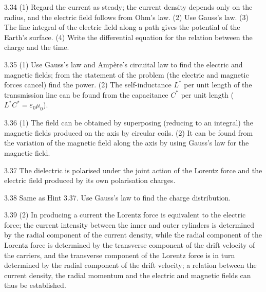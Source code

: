 \begin{hint}{3.34}
(1) Regard the current as steady; the current density depends only on the radius, and the electric field follows from Ohm's law. (2) Use Gauss's law. (3) The line integral of the electric field along a path gives the potential of the Earth's surface. (4) Write the differential equation for the relation between the charge and the time.
\end{hint}

\begin{hint}{3.35}
(1) Use Gauss's law and Ampère's circuital law to find the electric and magnetic fields; from the statement of the problem (the electric and magnetic forces cancel) find the power. (2) The self-inductance $L^*$ per unit length of the transmission line can be found from the capacitance $C^*$ per unit length ($L^*C^*=\varepsilon_0\mu_0$).
\end{hint}

\begin{hint}{3.36}
(1) The field can be obtained by superposing (reducing to an integral) the magnetic fields produced on the axis by circular coils. (2) It can be found from the variation of the magnetic field along the axis by using Gauss's law for the magnetic field.
\end{hint}

\begin{hint}{3.37}
The dielectric is polarised under the joint action of the Lorentz force and the electric field produced by its own polarisation charges.
\end{hint}

\begin{hint}{3.38}
Same as Hint 3.37. Use Gauss's law to find the charge distribution.
\end{hint}

\begin{hint}{3.39}
(2) In producing a current the Lorentz force is equivalent to the electric force; the current intensity between the inner and outer cylinders is determined by the radial component of the current density, while the radial component of the Lorentz force is determined by the transverse component of the drift velocity of the carriers, and the transverse component of the Lorentz force is in turn determined by the radial component of the drift velocity; a relation between the current density, the radial momentum and the electric and magnetic fields can thus be established.
\end{hint}

